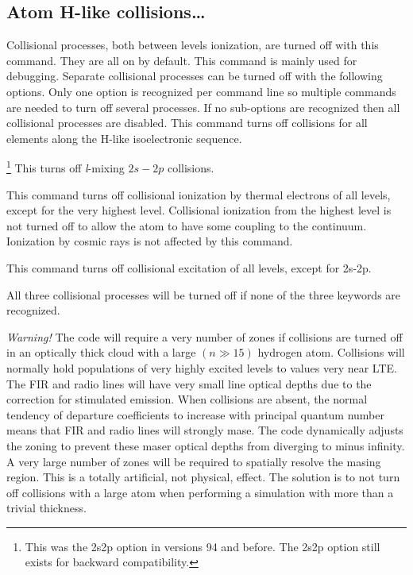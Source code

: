 \subsection{Atom H-like collisions\dots }

Collisional processes, both between levels ionization, are turned off
with this command.  They are all on by default.  This command is mainly
used for debugging.  Separate collisional processes can be turned off with
the following options.  Only one option is recognized per command line so
multiple commands are needed to turn off several processes.  If no
sub-options are recognized then all collisional processes are disabled.
This command turns off collisions for all elements along the H-like
isoelectronic sequence.

\footnote{This was the 2s2p option in versions 94 and before.  The 2s2p option
still exists for backward compatibility.}
This turns off \emph{l}-mixing $2s-2p$ collisions.

This command turns off collisional
ionization by thermal electrons of all levels,
except for the very highest level.
Collisional ionization from the highest level is not turned off
to allow the atom to have some coupling to the continuum.
Ionization by
cosmic rays is not affected by this command.

This command turns off collisional
excitation of all levels, except for 2s-2p.

All three collisional processes will be turned
off if none of the three keywords are recognized.

\emph{Warning!}  The code will require a very number of zones
if collisions
are turned off in an optically thick cloud with a large
$(n \gg 15)$ hydrogen atom.
Collisions will normally hold populations of very highly excited
levels to values very near LTE.
The FIR and radio lines will have very
small line optical depths due to the correction for stimulated emission.
When collisions are absent, the normal tendency of departure coefficients
to increase with principal quantum number means that FIR and radio lines
will strongly mase.
The code dynamically adjusts the zoning to prevent
these maser optical depths from diverging to minus infinity.
A very large
number of zones will be required to spatially resolve the masing region.
This is a totally artificial, not physical, effect.
The solution is to
not turn off collisions with a large atom when performing a
simulation with more than a trivial thickness.

